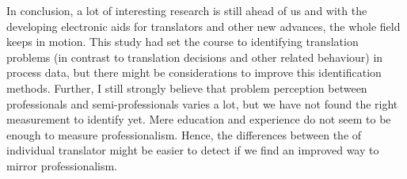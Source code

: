{In conclusion, a lot of interesting research is still ahead of us and with the  developing electronic aids for translators and other new advances, the whole field keeps in motion. This study had set the course to identifying translation problems (in contrast to translation decisions and other related behaviour) in process data, but there might be considerations to improve this identification methods. Further, I still} {strongly believe that problem perception between professionals and semi-professionals varies a lot, but we have not found the right measurement to identify  yet. Mere education and experience do not seem to be enough to measure professionalism. Hence, the differences between the  of individual translator might be easier to detect if we find an improved way to mirror professionalism.}
